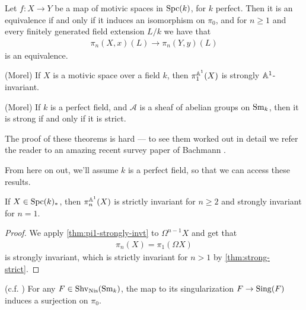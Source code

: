 \documentclass[11pt]{amsart}
\begin{document}
\begin{corollary} Let $f \colon X \to Y$ be a map of motivic spaces in $\mathrm{Spc}(k)$, for $k$ perfect. Then it is an equivalence if and only if it induces an isomorphism on $\pi_0$, and for $n\ge 1$ and every finitely generated field extension $L/k$ we have that
\begin{align*}
    \pi_n(X,x)(L) \to \pi_n(Y,y)(L)
\end{align*}
is an equivalence.
\end{corollary}


\begin{theorem}\label{thm:pi1-strongly-invt} 
(Morel) If $X$ is a motivic space over a field $k$, then $\pi_1^{\mathbb{A}^1}(X)$ is strongly $\mathbb{A}^1$-invariant.
\end{theorem}

\begin{theorem}\label{thm:strong-strict}
(Morel)
If $k$ is a perfect field, and $\mathcal{A}$ is a sheaf of abelian groups on $\mathrm{Sm}_k$, then it is strong if and only if it is strict.
\end{theorem}

The proof of these theorems is hard --- to see them worked out in detail we refer the reader to an amazing recent survey paper of Bachmann \cite{bachmannstrongly}.

\begin{assumption} From here on out, we'll assume $k$ is a perfect field, so that we can access these results.
\end{assumption}

\begin{corollary} If $X\in \mathrm{Spc}(k)_\ast$, then $\pi_n^{\mathbb{A}^1}(X)$ is strictly invariant for $n\ge 2$ and strongly invariant for $n=1$.
\end{corollary}
\begin{proof} We apply \autoref{thm:pi1-strongly-invt} to $\Omega^{n-1}X$ and get that
\begin{align*}
    \pi_n(X) = \pi_1(\Omega X)
\end{align*}
is strongly invariant, which is strictly invariant for $n>1$ by \autoref{thm:strong-strict}.
\end{proof}

\begin{theorem} \cite[\S.3.22]{MV} (c.f. \cite[2.7]{AD-excision})
For any $F\in \mathrm{Shv}_{\mathrm{Nis}}(\mathrm{Sm}_k)$, the map to its singularization $F \to \mathrm{Sing}(F)$ induces a surjection on $\pi_0$.
\end{theorem}
\end{document}
